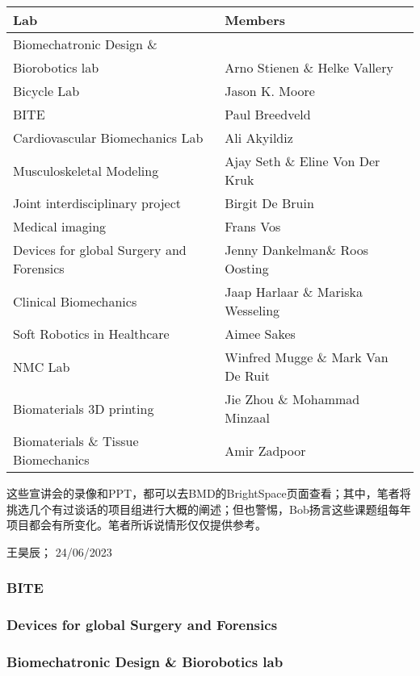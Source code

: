 \begin{center}
\begin{tabular*}{\textwidth}{@{\extracolsep{\fill}} p{} | p{}}
\textbf{Lab} & \textbf{Members} \\
\hline
Biomechatronic Design \& \\Biorobotics lab & Arno Stienen \& Helke Vallery \\
\hline
Bicycle Lab & Jason K. Moore \\
\hline
BITE & Paul Breedveld \\
\hline
Cardiovascular Biomechanics Lab & Ali Akyildiz \\
\hline
Musculoskeletal Modeling & Ajay Seth \& Eline Von Der Kruk \\
\hline
Joint interdisciplinary project & Birgit De Bruin \\
\hline
Medical imaging & Frans Vos \\
\hline
Devices for global Surgery and Forensics & Jenny Dankelman\& Roos Oosting \\
\hline
Clinical Biomechanics & Jaap Harlaar \& Mariska Wesseling \\
\hline
Soft Robotics in Healthcare & Aimee Sakes \\
\hline
NMC Lab & Winfred Mugge \& Mark Van De Ruit \\
\hline
Biomaterials 3D printing & Jie Zhou \& Mohammad Minzaal \\
\hline
Biomaterials \& Tissue Biomechanics & Amir Zadpoor \\
\end{tabular*}
\end{center}

这些宣讲会的录像和PPT，都可以去BMD的BrightSpace页面查看；其中，笔者将挑选几个有过谈话的项目组进行大概的阐述；但也警惕，Bob扬言这些课题组每年项目都会有所变化。笔者所诉说情形仅仅提供参考。
\begin{flushright}
王昊辰； 24/06/2023
\end{flushright}

\subsubsection{BITE}

\subsubsection{Devices for global Surgery and Forensics}

\subsubsection{Biomechatronic Design \& Biorobotics lab}




